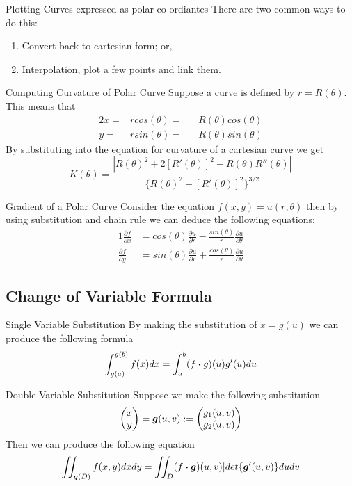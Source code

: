 \documentclass[11pt,a4paper]{article}
\begin{document}
\subtitle{Remark 13.03 - }{Plotting Curves expressed as polar co-ordiantes}
There are two common ways to do this:
\begin{enumerate}[label=\roman*)]
  \item Convert back to cartesian form; or,
  \item Interpolation, plot a few points and link them.
\end{enumerate}

\subtitle{Theorem 13.04 - }{Computing Curvature of Polar Curve}
Suppose a curve is defined by $r = R(\theta)$. This means that
\begin{alignat*}{2}
  x =& rcos(\theta) =&& R(\theta)cos(\theta) \\
  y =& rsin(\theta) =&& R(\theta)sin(\theta)
\end{alignat*}
By substituting into the equation for curvature of a cartesian curve we get
$$K(\theta) = \frac{|R(\theta)^2 + 2[R'(\theta)]^2 - R(\theta)R''(\theta)|}{\{R(\theta)^2 + [R'(\theta)]^2\}^{3/2}}$$

\subtitle{Theorem 13.05 - }{Gradient of a Polar Curve}
Consider the equation $f(x, y) = u(r, \theta)$ then by using substitution and chain rule we can deduce the following equations:
\begin{alignat*}{1}
  \frac{\partial f}{\partial x} &= cos(\theta)\frac{\partial u}{\partial r} - \frac{sin(\theta)}{r}\frac{\partial u}{\partial \theta} \\
  \frac{\partial f}{\partial y} &= sin(\theta)\frac{\partial u}{\partial r} + \frac{cos(\theta)}{r}\frac{\partial u}{\partial \theta}
\end{alignat*}

\subsection{Change of Variable Formula}

\subtitle{Theorem 13.06 - }{Single Variable Substitution}
By making the substitution of $x = g(u)$ we can produce the following formula
$$\int_{g(a)}^{g(b)}f(x) dx = \int_{a}^{b} (f \boldsymbol{\cdot} g)(u)g'(u)du$$

\subtitle{Theorem 13.07 - }{Double Variable Substitution}
Suppose we make the following substitution $$\begin{pmatrix} x \\ y \end{pmatrix} = \boldsymbol{g}(u, v) := \begin{pmatrix} g_{1}(u, v) \\ g_{2}(u, v) \end{pmatrix}$$
Then we can produce the following equation $$\iint_{\boldsymbol{g}(D)} f(x, y) dx dy = \iint_{D}(f \boldsymbol{\cdot} \boldsymbol{g})(u, v)|det\{\boldsymbol{g}'(u, v)\}dudv$$
\end{document}
